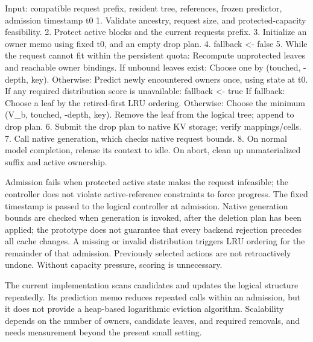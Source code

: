 \documentclass[sigconf, screen, review]{acmart}
\newenvironment{Shaded}{}{}
\providecommand{\NormalTok}[1]{#1}
\begin{document}
\begin{Shaded}
\begin{Highlighting}[]
\NormalTok{Input: compatible request prefix, resident tree, references,}
\NormalTok{       frozen predictor, admission timestamp t0}
\NormalTok{1. Validate ancestry, request size, and protected{-}capacity feasibility.}
\NormalTok{2. Protect active blocks and the current request\textquotesingle{}s prefix.}
\NormalTok{3. Initialize an owner memo using fixed t0, and an empty drop plan.}
\NormalTok{4. fallback \textless{}{-} false}
\NormalTok{5. While the request cannot fit within the persistent quota:}
\NormalTok{     Recompute unprotected leaves and reachable owner bindings.}
\NormalTok{     If unbound leaves exist:}
\NormalTok{         Choose one by (touched, {-}depth, key).}
\NormalTok{     Otherwise:}
\NormalTok{         Predict newly encountered owners once, using state at t0.}
\NormalTok{         If any required distribution score is unavailable:}
\NormalTok{             fallback \textless{}{-} true}
\NormalTok{         If fallback:}
\NormalTok{             Choose a leaf by the retired{-}first LRU ordering.}
\NormalTok{         Otherwise:}
\NormalTok{             Choose the minimum (V\_b, touched, {-}depth, key).}
\NormalTok{     Remove the leaf from the logical tree; append to drop plan.}
\NormalTok{6. Submit the drop plan to native KV storage; verify mappings/cells.}
\NormalTok{7. Call native generation, which checks native request bounds.}
\NormalTok{8. On normal model completion, release its context to idle.}
\NormalTok{   On abort, clean up unmaterialized suffix and active ownership.}
\end{Highlighting}
\end{Shaded}

Admission fails when protected active state makes the request
infeasible; the controller does not violate active-reference constraints
to force progress. The fixed timestamp is passed to the logical
controller at admission. Native generation bounds are checked when
generation is invoked, after the deletion plan has been applied; the
prototype does not guarantee that every backend rejection precedes all
cache changes. A missing or invalid distribution triggers LRU ordering
for the remainder of that admission. Previously selected actions are not
retroactively undone. Without capacity pressure, scoring is unnecessary.

The current implementation scans candidates and updates the logical
structure repeatedly. Its prediction memo reduces repeated calls within
an admission, but it does not provide a heap-based logarithmic eviction
algorithm. Scalability depends on the number of owners, candidate
leaves, and required removals, and needs measurement beyond the present
small setting.
\end{document}
